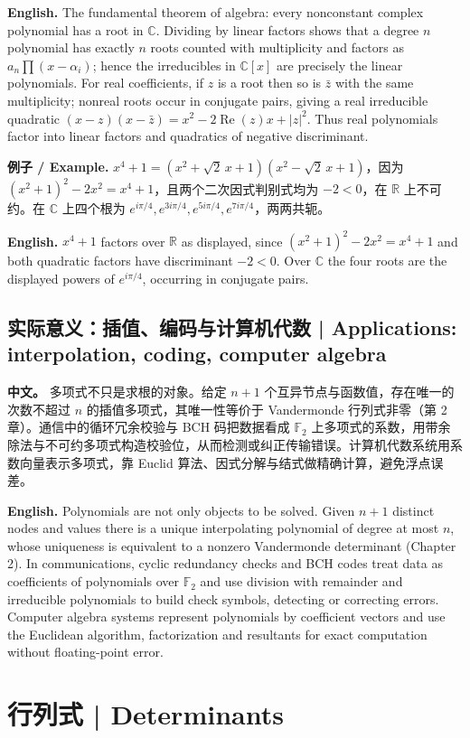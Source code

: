 \documentclass[UTF8,11pt,a4paper]{ctexart}
\newcommand{\EN}[1]{\par\noindent\textbf{English.} #1\par}
\newcommand{\EX}[2]{\par\noindent\textbf{例子 / Example.} #1\par\EN{#2}}
\newcommand{\APS}[2]{\par\noindent\textbf{中文。} #1\par\noindent\textbf{English.} #2\par\smallskip}
\begin{document}
\EN{The fundamental theorem of algebra: every nonconstant complex polynomial has a root in $\mathbb C$. Dividing by linear factors shows that a degree $n$ polynomial has exactly $n$ roots counted with multiplicity and factors as $a_n\prod(x-\alpha_i)$; hence the irreducibles in $\mathbb C[x]$ are precisely the linear polynomials. For real coefficients, if $z$ is a root then so is $\bar z$ with the same multiplicity; nonreal roots occur in conjugate pairs, giving a real irreducible quadratic $(x-z)(x-\bar z)=x^2-2\operatorname{Re}(z)x+|z|^2$. Thus real polynomials factor into linear factors and quadratics of negative discriminant.}
\EX{$x^4+1=(x^2+\sqrt2\,x+1)(x^2-\sqrt2\,x+1)$，因为 $(x^2+1)^2-2x^2=x^4+1$，且两个二次因式判别式均为 $-2<0$，在 $\mathbb R$ 上不可约。在 $\mathbb C$ 上四个根为 $e^{i\pi/4},e^{3i\pi/4},e^{5i\pi/4},e^{7i\pi/4}$，两两共轭。}{$x^4+1$ factors over $\mathbb R$ as displayed, since $(x^2+1)^2-2x^2=x^4+1$ and both quadratic factors have discriminant $-2<0$. Over $\mathbb C$ the four roots are the displayed powers of $e^{i\pi/4}$, occurring in conjugate pairs.}

\subsection{实际意义：插值、编码与计算机代数 | Applications: interpolation, coding, computer algebra}
\APS{多项式不只是求根的对象。给定 $n+1$ 个互异节点与函数值，存在唯一的次数不超过 $n$ 的插值多项式，其唯一性等价于 Vandermonde 行列式非零（第 2 章）。通信中的循环冗余校验与 BCH 码把数据看成 $\mathbb F_2$ 上多项式的系数，用带余除法与不可约多项式构造校验位，从而检测或纠正传输错误。计算机代数系统用系数向量表示多项式，靠 Euclid 算法、因式分解与结式做精确计算，避免浮点误差。}{Polynomials are not only objects to be solved. Given $n+1$ distinct nodes and values there is a unique interpolating polynomial of degree at most $n$, whose uniqueness is equivalent to a nonzero Vandermonde determinant (Chapter 2). In communications, cyclic redundancy checks and BCH codes treat data as coefficients of polynomials over $\mathbb F_2$ and use division with remainder and irreducible polynomials to build check symbols, detecting or correcting errors. Computer algebra systems represent polynomials by coefficient vectors and use the Euclidean algorithm, factorization and resultants for exact computation without floating-point error.}

\section{行列式 | Determinants}
\end{document}
